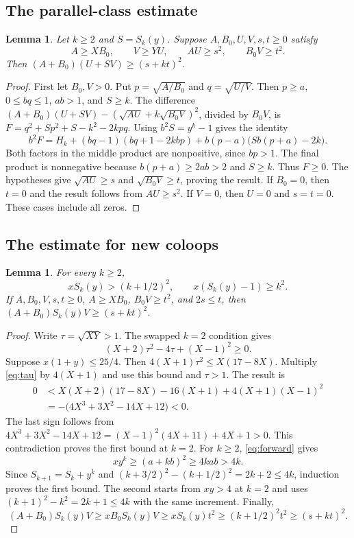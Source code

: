 \documentclass[11pt,a4paper]{article}
\newtheorem{lemma}[theorem]{Lemma}
\begin{document}
\subsection{The parallel-class estimate}
\begin{lemma}\label{lem:parallel-scalar}
Let $k\geq2$ and $S=S_k(y)$. Suppose $A,B_0,U,V,s,t\geq0$ satisfy
\[
A\geq XB_0,\qquad V\geq YU,\qquad AU\geq s^2,\qquad B_0V\geq t^2.
\]
Then $(A+B_0)(U+SV)\geq(s+kt)^2$.
\end{lemma}
\begin{proof}
First let $B_0,V>0$. Put $p=\sqrt{A/B_0}$ and $q=\sqrt{U/V}$.
Then $p\geq a$, $0\leq bq\leq1$, $ab>1$, and $S\geq k$.
The difference
$(A+B_0)(U+SV)-(\sqrt{AU}+k\sqrt{B_0V})^2$, divided by $B_0V$, is
$F=q^2+Sp^2+S-k^2-2kpq$. Using $b^2S=y^k-1$ gives the identity
\begin{equation}\label{eq:scalar-identity}
b^2F=H_k+(bq-1)(bq+1-2kbp)+b(p-a)\bigl(Sb(p+a)-2k\bigr).
\end{equation}
Both factors in the middle product are nonpositive, since $bp>1$.
The final product is nonnegative because $b(p+a)\geq2ab>2$ and
$S\geq k$. Thus $F\geq0$. The hypotheses give $\sqrt{AU}\geq s$
and $\sqrt{B_0V}\geq t$, proving the result.
If $B_0=0$, then $t=0$ and the result follows from $AU\geq s^2$.
If $V=0$, then $U=0$ and $s=t=0$. These cases include all zeros.
\end{proof}

\subsection{The estimate for new coloops}
\begin{lemma}\label{lem:coloop-scalar}
For every $k\geq2$,
\[
xS_k(y)>(k+1/2)^2,\qquad x(S_k(y)-1)\geq k^2.
\]
If $A,B_0,V,s,t\geq0$, $A\geq XB_0$, $B_0V\geq t^2$, and $2s\leq t$,
then $(A+B_0)S_k(y)V\geq(s+kt)^2$.
\end{lemma}
\begin{proof}
Write $\tau=\sqrt{XY}>1$. The swapped $k=2$ condition gives
\begin{equation}\label{eq:tau}
(X+2)\tau^2-4\tau+(X-1)^2\geq0.
\end{equation}
Suppose $x(1+y)\leq25/4$. Then
$4(X+1)\tau^2\leq X(17-8X)$. Multiply \eqref{eq:tau} by $4(X+1)$
and use this bound and $\tau>1$. The result is
\begin{align*}
0&<X(X+2)(17-8X)-16(X+1)+4(X+1)(X-1)^2\\
 &=-\bigl(4X^3+3X^2-14X+12\bigr)<0.
\end{align*}
The last sign follows from
$4X^3+3X^2-14X+12=(X-1)^2(4X+11)+4X+1>0$.
This contradiction proves the first bound at $k=2$.
For $k\geq2$, \eqref{eq:forward} gives
\begin{equation}\label{eq:increment}
xy^k\geq(a+kb)^2\geq4kab>4k.
\end{equation}
Since $S_{k+1}=S_k+y^k$ and
$(k+3/2)^2-(k+1/2)^2=2k+2\leq4k$, induction proves the first bound.
The second starts from $xy>4$ at $k=2$ and uses
$(k+1)^2-k^2=2k+1\leq4k$ with the same increment.
Finally,
\[
(A+B_0)S_k(y)V\geq xB_0S_k(y)V
\geq xS_k(y)t^2\geq(k+1/2)^2t^2\geq(s+kt)^2.
\]
\end{proof}
\end{document}
